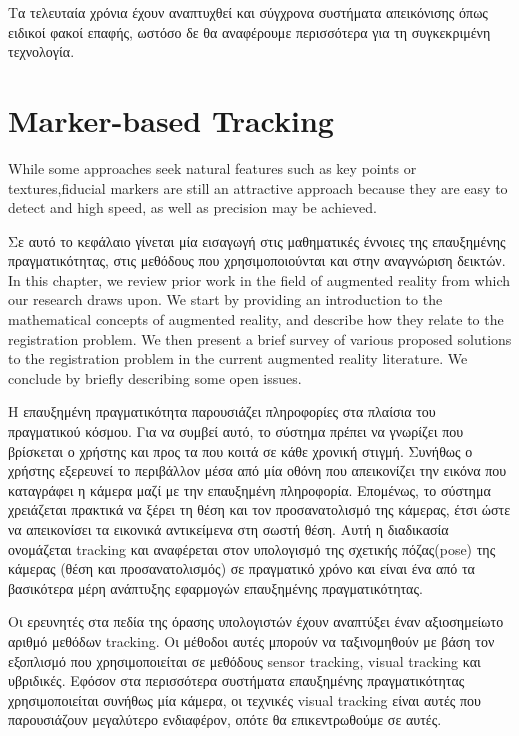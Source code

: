 Τα τελευταία χρόνια έχουν αναπτυχθεί και σύγχρονα συστήματα απεικόνισης όπως ειδικοί φακοί επαφής, ωστόσο δε θα αναφέρουμε περισσότερα για τη συγκεκριμένη τεχνολογία.





\section{Marker-based Tracking}

While some approaches seek natural features such as key points or textures,fiducial markers are still an attractive approach because they are easy to detect and high speed, as well as precision may be achieved.


Σε αυτό το κεφάλαιο γίνεται μία εισαγωγή στις μαθηματικές έννοιες της επαυξημένης πραγματικότητας, στις μεθόδους που χρησιμοποιούνται και στην αναγνώριση δεικτών.  
In this chapter, we review prior work in the field of augmented reality from which our research draws upon. We start by providing an introduction to the mathematical concepts of augmented reality, and describe how they relate to the registration problem. We then present a brief survey of various proposed solutions to the registration problem in the current augmented reality literature. We conclude by briefly describing some open issues.

Η επαυξημένη πραγματικότητα παρουσιάζει πληροφορίες στα πλαίσια του πραγματικού κόσμου. Για να συμβεί αυτό, το σύστημα πρέπει να γνωρίζει που βρίσκεται ο χρήστης και προς τα που κοιτά σε κάθε χρονική στιγμή. Συνήθως ο χρήστης εξερευνεί το περιβάλλον μέσα από μία οθόνη που απεικονίζει την εικόνα που καταγράφει η κάμερα μαζί με την επαυξημένη πληροφορία.  
Επομένως, το σύστημα χρειάζεται πρακτικά να ξέρει τη θέση και τον προσανατολισμό της κάμερας, έτσι ώστε να απεικονίσει τα εικονικά αντικείμενα στη σωστή θέση. Αυτή η διαδικασία ονομάζεται tracking και αναφέρεται στον υπολογισμό της σχετικής πόζας(pose) της κάμερας (θέση και προσανατολισμός) σε πραγματικό χρόνο και είναι ένα από τα βασικότερα μέρη ανάπτυξης εφαρμογών επαυξημένης πραγματικότητας.


Οι ερευνητές στα πεδία της όρασης υπολογιστών έχουν αναπτύξει έναν αξιοσημείωτο αριθμό μεθόδων tracking. Οι μέθοδοι αυτές μπορούν να ταξινομηθούν με βάση τον εξοπλισμό που χρησιμοποιείται σε μεθόδους sensor tracking, visual tracking και υβριδικές. Εφόσον στα περισσότερα συστήματα επαυξημένης πραγματικότητας χρησιμοποιείται συνήθως μία κάμερα, οι τεχνικές visual tracking είναι αυτές που παρουσιάζουν μεγαλύτερο ενδιαφέρον, οπότε θα επικεντρωθούμε σε αυτές.


